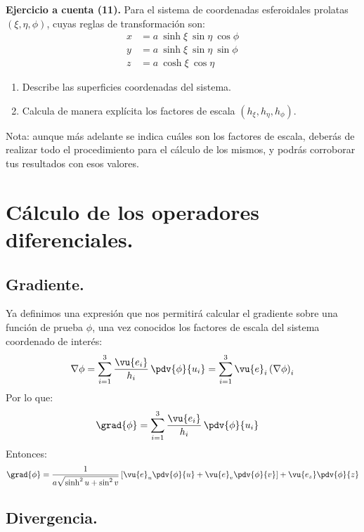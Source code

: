 \noindent
\textbf{Ejercicio a cuenta (11). } Para el sistema de coordenadas esferoidales prolatas $(\xi, \eta, \phi)$, cuyas reglas de transformación son:
\begin{align*}
x &= a \: \sinh \xi \: \sin \eta \: \cos \phi\\
y &= a \: \sinh \xi \: \sin \eta \: \sin \phi\\
z &= a \: \cosh \xi \: \cos \eta
\end{align*}
\begin{enumerate}
\item Describe las superficies coordenadas del sistema.
\item Calcula de manera explícita los factores de escala $(h_{\xi}, h_{\eta}, h_{\phi})$.
\end{enumerate}
Nota: aunque más adelante se indica cuáles son los factores de escala, deberás de realizar todo el procedimiento para el cálculo de los mismos, y podrás corroborar tus resultados con esos valores.

\section{Cálculo de los operadores diferenciales.}

\subsection{Gradiente.}

Ya definimos una expresión que nos permitirá calcular el gradiente sobre una función de prueba $\phi$, una vez conocidos los factores de escala del sistema coordenado de interés:
\begin{align*}
\nabla{\phi} = \sum_{i=1}^{3} \dfrac{\vu{e_{i}}}{h_{i}} \, \pdv{\phi}{u_{i}} = \sum_{i=1}^{3} \vu{e}_{i} \left( \nabla{\phi} \right)_{i}
\end{align*}
Por lo que: 
\begin{align*}
\grad{\phi} &= \sum_{i=1}^{3} \dfrac{\vu{e_{i}}}{h_{i}} \, \pdv{\phi}{u_{i}}
\end{align*}
Entonces:
\begin{align*}
\grad{\phi} = \dfrac{1}{a \sqrt{\sinh^{2} u + \sin^{2} v}} \left[ \vu{e}_{u} \pdv{\phi}{u} + \vu{e}_{v} \pdv{\phi}{v} \right] + \vu{e_{z}} \pdv{\phi}{z}
\end{align*}

\subsection{Divergencia.}

